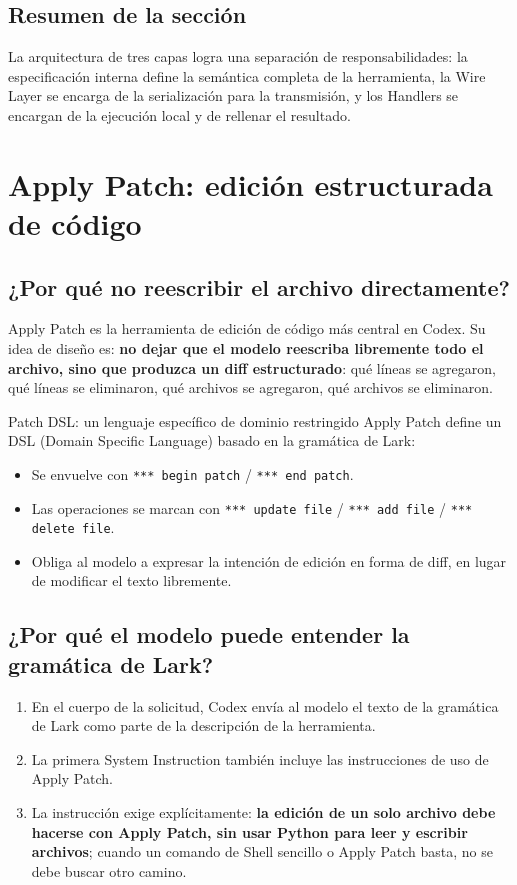 \documentclass[a4paper]{article}
\begin{document}
\subsection{Resumen de la sección}

La arquitectura de tres capas logra una separación de responsabilidades: la especificación interna define la semántica completa de la herramienta, la Wire Layer se encarga de la serialización para la transmisión, y los Handlers se encargan de la ejecución local y de rellenar el resultado.


\section{Apply Patch: edición estructurada de código}

\subsection{¿Por qué no reescribir el archivo directamente?}

Apply Patch es la herramienta de edición de código más central en Codex. Su idea de diseño es: \textbf{no dejar que el modelo reescriba libremente todo el archivo, sino que produzca un diff estructurado}: qué líneas se agregaron, qué líneas se eliminaron, qué archivos se agregaron, qué archivos se eliminaron.

\begin{importantbox}{Patch DSL: un lenguaje específico de dominio restringido}
Apply Patch define un DSL (Domain Specific Language) basado en la gramática de Lark:
\begin{itemize}
    \item Se envuelve con \texttt{*** begin patch} / \texttt{*** end patch}.
    \item Las operaciones se marcan con \texttt{*** update file} / \texttt{*** add file} / \texttt{*** delete file}.
    \item Obliga al modelo a expresar la intención de edición en forma de diff, en lugar de modificar el texto libremente.
\end{itemize}
\end{importantbox}

\subsection{¿Por qué el modelo puede entender la gramática de Lark?}

\begin{enumerate}
    \item En el cuerpo de la solicitud, Codex envía al modelo el texto de la gramática de Lark como parte de la descripción de la herramienta.
    \item La primera System Instruction también incluye las instrucciones de uso de Apply Patch.
    \item La instrucción exige explícitamente: \textbf{la edición de un solo archivo debe hacerse con Apply Patch, sin usar Python para leer y escribir archivos}; cuando un comando de Shell sencillo o Apply Patch basta, no se debe buscar otro camino.
\end{enumerate}
\end{document}
